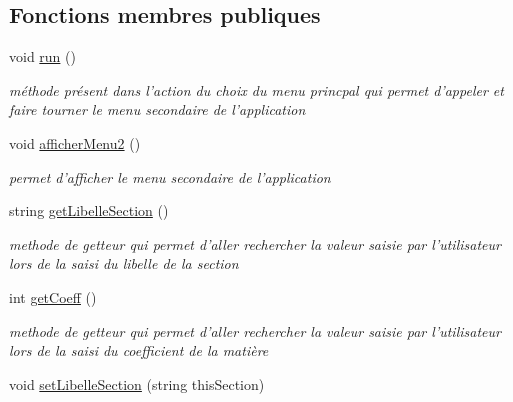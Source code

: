 \subsection*{Fonctions membres publiques}
\begin{DoxyCompactItemize}
\item 
\hypertarget{class_section_ad60532fac7868faad0b9b6ae413c860d}{void \hyperlink{class_section_ad60532fac7868faad0b9b6ae413c860d}{run} ()}\label{class_section_ad60532fac7868faad0b9b6ae413c860d}

\begin{DoxyCompactList}\small\item\em méthode présent dans l'action du choix du menu princpal qui permet d'appeler et faire tourner le menu secondaire de l'application \end{DoxyCompactList}\item 
\hypertarget{class_section_ac23af2bd97ad21270f0a8a917ae9afa5}{void \hyperlink{class_section_ac23af2bd97ad21270f0a8a917ae9afa5}{afficher\+Menu2} ()}\label{class_section_ac23af2bd97ad21270f0a8a917ae9afa5}

\begin{DoxyCompactList}\small\item\em permet d'afficher le menu secondaire de l'application \end{DoxyCompactList}\item 
\hypertarget{class_section_a87e0a87007299f84d33af2e271996b73}{string \hyperlink{class_section_a87e0a87007299f84d33af2e271996b73}{get\+Libelle\+Section} ()}\label{class_section_a87e0a87007299f84d33af2e271996b73}

\begin{DoxyCompactList}\small\item\em methode de getteur qui permet d'aller rechercher la valeur saisie par l'utilisateur lors de la saisi du libelle de la section \end{DoxyCompactList}\item 
\hypertarget{class_section_a78293be5394560b79aeafed3bee45bcc}{int \hyperlink{class_section_a78293be5394560b79aeafed3bee45bcc}{get\+Coeff} ()}\label{class_section_a78293be5394560b79aeafed3bee45bcc}

\begin{DoxyCompactList}\small\item\em methode de getteur qui permet d'aller rechercher la valeur saisie par l'utilisateur lors de la saisi du coefficient de la matière \end{DoxyCompactList}\item 
\hypertarget{class_section_a60b70a27e31ab4418bb183c31b167092}{void \hyperlink{class_section_a60b70a27e31ab4418bb183c31b167092}{set\+Libelle\+Section} (string this\+Section)}\label{class_section_a60b70a27e31ab4418bb183c31b167092}


\end{DoxyCompactItemize}
